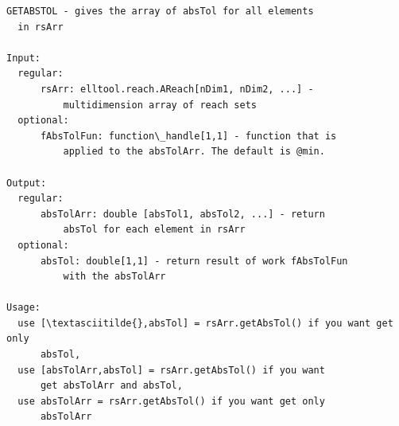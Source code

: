 \documentclass[letterpaper,10pt,english]{sphinxmanual}
\begin{document}
\label{chap_func:elltool-reach-areach-getabstol}
\begin{Verbatim}[commandchars=\\\{\}]
GETABSTOL - gives the array of absTol for all elements
  in rsArr

Input:
  regular:
      rsArr: elltool.reach.AReach[nDim1, nDim2, ...] -
          multidimension array of reach sets
  optional:
      fAbsTolFun: function\_handle[1,1] - function that is
          applied to the absTolArr. The default is @min.

Output:
  regular:
      absTolArr: double [absTol1, absTol2, ...] - return
          absTol for each element in rsArr
  optional:
      absTol: double[1,1] - return result of work fAbsTolFun
          with the absTolArr

Usage:
  use [\textasciitilde{},absTol] = rsArr.getAbsTol() if you want get only
      absTol,
  use [absTolArr,absTol] = rsArr.getAbsTol() if you want
      get absTolArr and absTol,
  use absTolArr = rsArr.getAbsTol() if you want get only
      absTolArr
\end{Verbatim}
\label{chap_func:elltool-reach-areach-getcopy}
\end{document}
